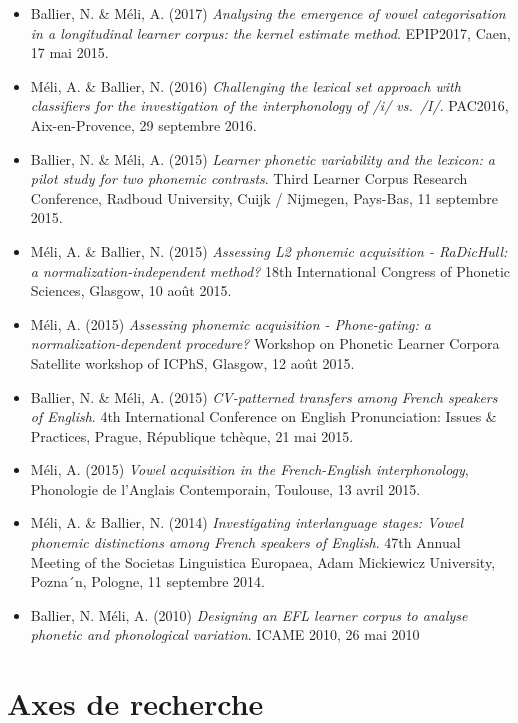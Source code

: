 \documentclass[
  10pt,
]{article}
\begin{document}
\begin{itemize}
\item
  Ballier, N. \& Méli, A. (2017) \emph{Analysing the emergence of vowel categorisation in a longitudinal learner
  corpus: the kernel estimate method}. EPIP2017, Caen, 17 mai 2015.
\item
  Méli, A. \& Ballier, N. (2016) \emph{Challenging the lexical set approach with classifiers for the investigation of the interphonology of /i/ vs.~/I/}. PAC2016, Aix-en-Provence, 29 septembre 2016.
\item
  Ballier, N. \& Méli, A. (2015) \emph{Learner phonetic variability and the lexicon: a pilot study for two phonemic contrasts}. Third Learner Corpus Research Conference, Radboud University, Cuijk / Nijmegen, Pays-Bas, 11 septembre 2015.
\item
  Méli, A. \& Ballier, N. (2015) \emph{Assessing L2 phonemic acquisition - RaDicHull: a normalization-independent method?} 18th International Congress of Phonetic Sciences, Glasgow, 10 août 2015.
\item
  Méli, A. (2015) \emph{Assessing phonemic acquisition - Phone-gating: a normalization-dependent procedure?} Workshop on Phonetic Learner Corpora Satellite workshop of ICPhS, Glasgow, 12 août 2015.
\item
  Ballier, N. \& Méli, A. (2015) \emph{CV-patterned transfers among French speakers of English}. 4th International Conference on English Pronunciation: Issues \& Practices, Prague, République tchèque, 21 mai 2015.
\item
  Méli, A. (2015) \emph{Vowel acquisition in the French-English interphonology}, Phonologie de l'Anglais Contemporain, Toulouse, 13 avril 2015.
\item
  Méli, A. \& Ballier, N. (2014) \emph{Investigating interlanguage stages: Vowel phonemic distinctions among French speakers of English}. 47th Annual Meeting of the Societas Linguistica Europaea, Adam Mickiewicz University, Pozna´n, Pologne, 11 septembre 2014.
\item
  Ballier, N. Méli, A. (2010) \emph{Designing an EFL learner corpus to analyse phonetic and phonological variation}. ICAME 2010, 26 mai 2010
\end{itemize}

\pagebreak

\hypertarget{axes-de-recherche}{%
\section{Axes de recherche}\label{axes-de-recherche}}
\end{document}
